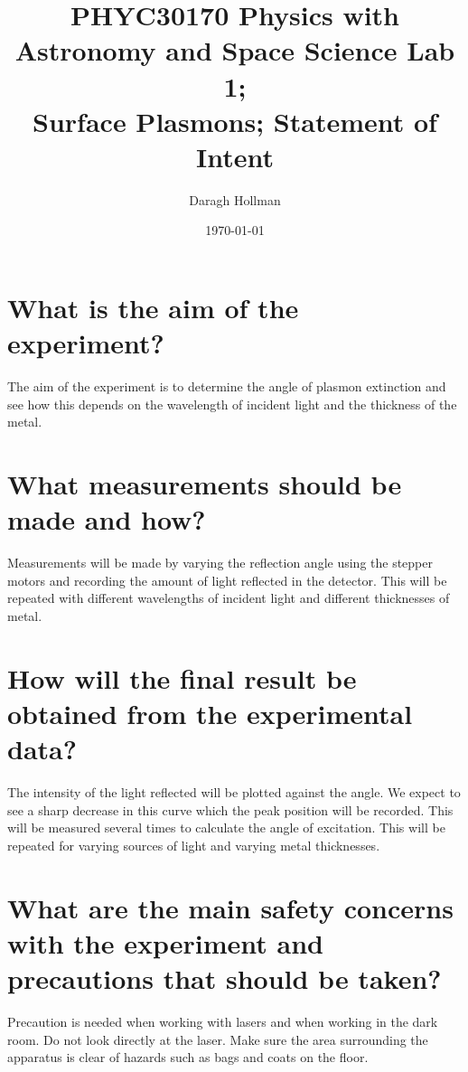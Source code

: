 \documentclass[%
reprint,
amsmath,amssymb,
aps,
]{revtex4-2}
\begin{document}
	\title{PHYC30170 Physics with Astronomy and Space Science Lab 1;\\
	Surface Plasmons; Statement of Intent}
	
	\author{Daragh Hollman}
	
	\date{\today}
	
	\maketitle
	
	\onecolumngrid
	\section{What is the aim of the experiment?}
		The aim of the experiment is to determine the angle of plasmon extinction and see how this depends on the wavelength of incident light and the thickness of the metal.
	
	\section{What measurements should be made and how?}
		Measurements will be made by varying the reflection angle using the stepper motors and recording the amount of light reflected in the detector. This will be repeated with different wavelengths of incident light and different thicknesses of metal.
	
	\section{How will the final result be obtained from the experimental data?}
		The intensity of the light reflected will be plotted against the angle. We expect to see a sharp decrease in this curve which the peak position will be recorded. This will be measured several times to calculate the angle of excitation. This will be repeated for varying sources of light and varying metal thicknesses.
	
	\section{What are the main safety concerns with the experiment and precautions that should be taken?}
		Precaution is needed when working with lasers and when working in the dark room. Do not look directly at the laser. Make sure the area surrounding the apparatus is clear of hazards such as bags and coats on the floor.
	
\end{document}
